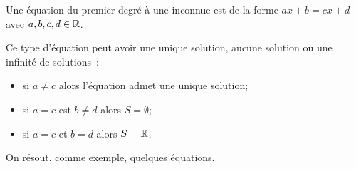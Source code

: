 \documentclass[a4paper,12pt]{report}
\begin{document}
Une équation du premier degré à une inconnue est de la forme $ax+b=cx+d$ avec $a,b,c,d\in \mathbb R$.
\begin{boiteExT}
\vspace{7cm}

\end{boiteExT}
Ce type d'équation peut avoir une unique solution, aucune solution ou une infinité de solutions~:
\begin{itemize}
	\item[] si $a\neq c$ alors l'équation admet une unique solution;
	\item[] si $a=c$ est $b\neq d$ alors $S=\emptyset$;
	\item[] si $a=c$ et $b=d$ alors $S=\mathbb R$.
\end{itemize}
\begin{boiteExT}
\vspace{10cm}

\end{boiteExT}
\newpage
On résout, comme exemple, quelques équations.
\begin{boiteExT}
\vspace{10cm}

\end{boiteExT}
\begin{boiteExT}
\vspace{10cm}

\end{boiteExT}
\end{document}

